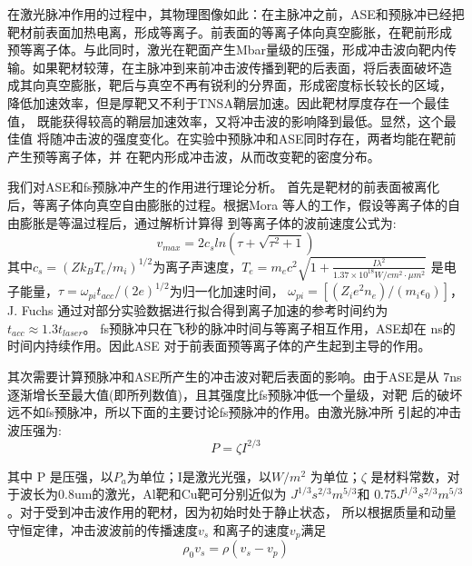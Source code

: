 在激光脉冲作用的过程中，其物理图像如此：在主脉冲之前，ASE和预脉冲已经把
靶材前表面加热电离，形成等离子。前表面的等离子体向真空膨胀，在靶前形成
预等离子体。与此同时，激光在靶面产生Mbar量级的压强，形成冲击波向靶内传
输。如果靶材较薄，在主脉冲到来前冲击波传播到靶的后表面，将后表面破坏造
成其向真空膨胀，靶后与真空不再有锐利的分界面，形成密度标长较长的区域，
降低加速效率，但是厚靶又不利于TNSA鞘层加速。因此靶材厚度存在一个最佳值，
既能获得较高的鞘层加速效率，又将冲击波的影响降到最低。显然，这个最佳值
将随冲击波的强度变化。在实验中预脉冲和ASE同时存在，两者均能在靶前产生预等离子体，并
在靶内形成冲击波，从而改变靶的密度分布。


我们对ASE和fs预脉冲产生的作用进行理论分析。
首先是靶材的前表面被离化后，等离子体向真空自由膨胀的过程。根据Mora
等人的工作\cite{mora2003plasma,mora2005thin}，假设等离子体的自由膨胀是等温过程后，通过解析计算得
到等离子体的波前速度公式为:
\begin{equation}
\label{eqn:waveFrontVelocity}
v_{max}=2 c_s ln(\tau + \sqrt{{\tau}^2+1})
\end{equation}     
其中$c_s=(Z k_B T_e / m_i)^{1/2}$为离子声速度，$T_e=m_e c^2 \sqrt{1+\frac{I {\lambda}^2}{{1.37} \times {10}^{18} W/cm^2 \cdot \mu m^2}}$ 是电子能量\cite{kruer1985j}，$\tau={\omega}_{pi} t_{acc}/(2e)^{1/2}$为归一化加速时间， ${\omega}_{pi}=[(Z_i e^2 n_e)/(m_i {\epsilon}_0)]$，J. Fuchs \cite{fuchs2006laser} 通过对部分实验数据进行拟合得到离子加速的参考时间约为 $t_{acc} \approx 1.3 t_{laser}$。
fs预脉冲只在飞秒的脉冲时间与等离子相互作用，ASE却在
ns的时间内持续作用。因此ASE 对于前表面预等离子体的产生起到主导的作用。


其次需要计算预脉冲和ASE所产生的冲击波对靶后表面的影响。由于ASE是从
7ns逐渐增长至最大值(即所列数值)，且其强度比fs预脉冲低一个量级，对靶
后的破坏远不如fs预脉冲，所以下面的主要讨论fs预脉冲的作用。由激光脉冲所
引起的冲击波压强为\cite{lindl1995development}:
\begin{equation}
\label{eqn:shockPressure}
P= \zeta I ^{2/3}
\end{equation}     

其中 P 是压强，以$P_a$为单位；I是激光光强，以$W/m^2$ 为单位；$\zeta$ 是材料常数，对于波长为0.8um的激光，Al靶和Cu靶可分别近似为 $J^{1/3} s^{2/3} m^{5/3} $和
$0.75 J^{1/3} s^{2/3} m^{5/3} $
\cite{swift2004shock}。对于受到冲击波作用的靶材，因为初始时处于静止状态，
所以根据质量和动量守恒定律，冲击波波前的传播速度$v_s$ 和离子的速度$v_p$满足
\begin{equation}
\label{eqn:shockEquation1}
\rho_0 v_s = \rho (v_s - v_p)
\end{equation}     

